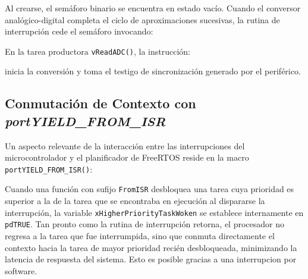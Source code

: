 

Al crearse, el semáforo binario se encuentra en estado vacío. Cuando el conversor analógico-digital completa el ciclo
de aproximaciones sucesivas, la rutina de interrupción cede el semáforo invocando:



En la tarea productora \texttt{vReadADC()}, la instrucción:



inicia la conversión y toma el testigo de sincronización generado por el periférico.

\subsection{Conmutación de Contexto con \textit{portYIELD\_FROM\_ISR}}

Un aspecto relevante de la interacción entre las interrupciones del microcontrolador y el planificador de FreeRTOS
reside en la macro \texttt{portYIELD\_FROM\_ISR()}:



Cuando una función con sufijo \texttt{FromISR} desbloquea una tarea cuya prioridad es superior a la de la tarea que
se encontraba en ejecución al dispararse la interrupción, la variable \texttt{xHigherPriorityTaskWoken} se establece
internamente en \texttt{pdTRUE}. Tan pronto como la rutina de interrupción retorna, el procesador
no regresa a la tarea que fue interrumpida, sino que conmuta directamente el contexto hacia la tarea de mayor prioridad
recién desbloqueada, minimizando la latencia de respuesta del sistema. Esto es posible gracias a una interrupcion por
software.
